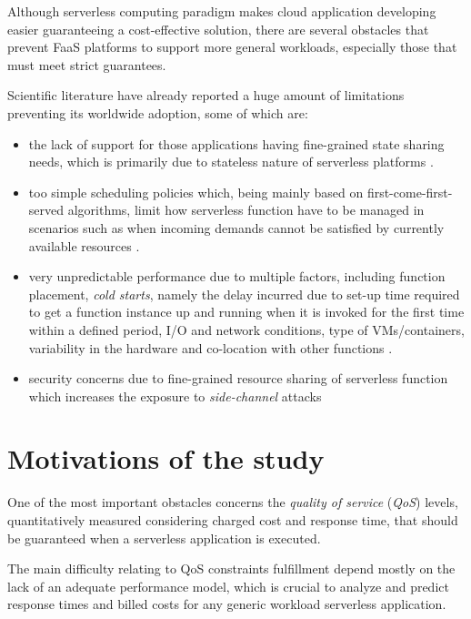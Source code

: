 \documentclass[12pt,a4paper]{report}
\begin{document}
Although serverless computing paradigm makes cloud application developing easier guaranteeing a cost-effective solution, there are several obstacles that prevent FaaS platforms to support more general workloads, especially those that must meet strict guarantees.

Scientific literature have already reported a huge amount of limitations preventing its worldwide adoption, some of which are:

\begin{itemize}
	
	\item the lack of support for those applications having fine-grained state sharing needs, which is primarily due to stateless nature of serverless platforms \cite{BerkeleyView}.
	
	\item too simple scheduling policies which, being mainly based on first-come-first-served algorithms, limit how serverless function have to be managed in scenarios such as when incoming demands cannot
	be satisfied by currently available resources \cite{Sequoia}.
	
	\item very unpredictable performance due to multiple factors, including function placement, \textit{cold starts}, namely the delay incurred due to set-up time required to get a function instance up and running when it is invoked for the first time within a defined period, I/O and network conditions, type of VMs/containers, variability in the hardware and co-location with other functions \cite{COSE}\cite{BerkeleyView}.
	
	\item security concerns due to fine-grained resource sharing of serverless function which increases the exposure to \textit{side-channel} attacks \cite{NextPhase}
	
\end{itemize}

\section{Motivations of the study}

One of the most important obstacles concerns the \textit{quality of service} (\textit{QoS}) levels, quantitatively measured considering charged cost and response time, that should be guaranteed when a serverless application is executed.

The main difficulty relating to QoS constraints fulfillment depend mostly on the lack of an adequate performance model, which is crucial to analyze and predict response times and billed costs for any generic workload serverless application. 
\end{document}

